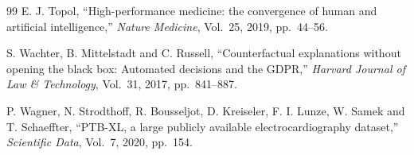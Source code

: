 \documentclass[a4paper,12pt,oneside]{book}
\begin{document}
\begin{thebibliography}{99}
E. J. Topol, ``High-performance medicine: the convergence of human and artificial intelligence,'' {\em Nature Medicine}, Vol.~25, 2019, pp.~44--56.

S. Wachter, B. Mittelstadt and C. Russell, ``Counterfactual explanations without opening the black box: Automated decisions and the GDPR,'' {\em Harvard Journal of Law \& Technology}, Vol.~31, 2017, pp.~841--887.

P. Wagner, N. Strodthoff, R. Bousseljot, D. Kreiseler, F. I. Lunze, W. Samek and T. Schaeffter, ``PTB-XL, a large publicly available electrocardiography dataset,'' {\em Scientific Data}, Vol.~7, 2020, pp.~154.

\end{thebibliography}
\end{document}
